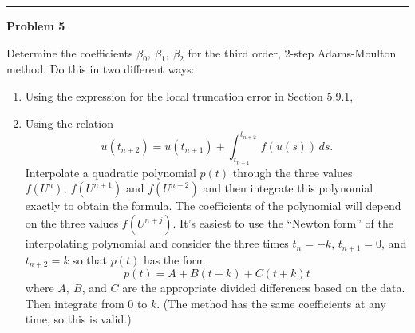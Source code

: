 \documentclass[10pt]{article}
\begin{document}



\vskip 1cm
\hrule
{\bf Problem 5}

Determine the coefficients $\beta_0,~\beta_1,~\beta_2$ for the third
order, 2-step Adams-Moulton method.  Do this in two different ways:
\begin{enumerate} 
 \item Using the expression for the local truncation error in Section 5.9.1,
 \item Using the relation
 \[
 u(t_{n+2}) = u(t_{n+1}) + \int_{t_{n+1}}^{t_{n+2}}\,f(u(s))\,ds.
 \]
 Interpolate  a quadratic polynomial $p(t)$ through the three values
 $f(U^n),~f(U^{n+1})$ and $f(U^{n+2})$ and then integrate this polynomial
 exactly to obtain the formula.  The coefficients of the polynomial will
 depend on the three values $f(U^{n+j})$.   It's easiest to use the
 ``Newton form'' of the interpolating polynomial and consider the three
times $t_n=-k$, $t_{n+1}=0$, and $t_{n+2}=k$ so that $p(t)$ has the form
\[
p(t) = A + B(t+k) + C(t+k)t
\]
where $A,~B$, and $C$ are the appropriate divided differences based on the
data.  Then integrate from $0$ to $k$.   (The method has the same
coefficients at any time, so this is valid.)
\end{enumerate}




\end{document}
